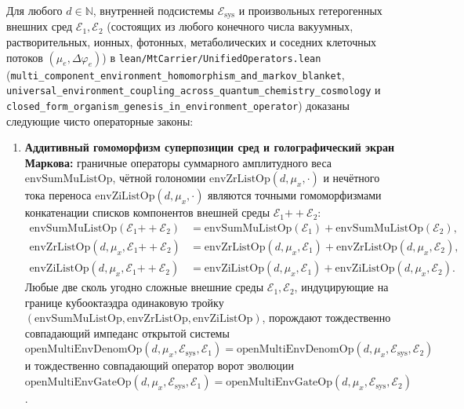 \begin{theorem}
\label{thm:bio-closed-form-genesis-in-environment}
Для любого $d\in\mathbb{N}$, внутренней подсистемы $\mathcal{E}_{\mathrm{sys}}$ и произвольных гетерогенных внешних сред $\mathcal{E}_1,\mathcal{E}_2$ (состоящих из любого конечного числа вакуумных, растворительных, ионных, фотонных, метаболических и соседних клеточных потоков $(\mu_e,\Delta\varphi_e)$) в \texttt{lean/MtCarrier/UnifiedOperators.lean} (\texttt{multi\_component\_environment\_homomorphism\_and\_markov\_blanket}, \texttt{universal\_environment\_coupling\_across\_quantum\_chemistry\_cosmology} и \texttt{closed\_form\_organism\_genesis\_in\_environment\_operator}) доказаны следующие чисто операторные законы:
\begin{enumerate}[label=\textbf{(\roman*)},leftmargin=*]
\item \textbf{Аддитивный гомоморфизм суперпозиции сред и голографический экран Маркова:}
  граничные операторы суммарного амплитудного веса $\mathrm{envSumMuListOp}$, чётной голономии $\mathrm{envZrListOp}(d,\mu_x,\cdot)$ и нечётного тока переноса $\mathrm{envZiListOp}(d,\mu_x,\cdot)$ являются точными гомоморфизмами конкатенации списков компонентов внешней среды $\mathcal{E}_1\mathbin{++}\mathcal{E}_2$:
  \begin{equation}
  \label{eq:env-list-homomorphism}
  \begin{aligned}
    \mathrm{envSumMuListOp}(\mathcal{E}_1\mathbin{++}\mathcal{E}_2) &= \mathrm{envSumMuListOp}(\mathcal{E}_1) + \mathrm{envSumMuListOp}(\mathcal{E}_2),\\
    \mathrm{envZrListOp}(d,\mu_x,\mathcal{E}_1\mathbin{++}\mathcal{E}_2) &= \mathrm{envZrListOp}(d,\mu_x,\mathcal{E}_1) + \mathrm{envZrListOp}(d,\mu_x,\mathcal{E}_2),\\
    \mathrm{envZiListOp}(d,\mu_x,\mathcal{E}_1\mathbin{++}\mathcal{E}_2) &= \mathrm{envZiListOp}(d,\mu_x,\mathcal{E}_1) + \mathrm{envZiListOp}(d,\mu_x,\mathcal{E}_2).
  \end{aligned}
  \end{equation}
  Любые две сколь угодно сложные внешние среды $\mathcal{E}_1,\mathcal{E}_2$, индуцирующие на границе кубооктаэдра одинаковую тройку $(\mathrm{envSumMuListOp},\mathrm{envZrListOp},\mathrm{envZiListOp})$, порождают тождественно совпадающий импеданс открытой системы $\mathrm{openMultiEnvDenomOp}(d,\mu_x,\mathcal{E}_{\mathrm{sys}},\mathcal{E}_1) = \mathrm{openMultiEnvDenomOp}(d,\mu_x,\mathcal{E}_{\mathrm{sys}},\mathcal{E}_2)$ и тождественно совпадающий оператор ворот эволюции $\mathrm{openMultiEnvGateOp}(d,\mu_x,\mathcal{E}_{\mathrm{sys}},\mathcal{E}_1) = \mathrm{openMultiEnvGateOp}(d,\mu_x,\mathcal{E}_{\mathrm{sys}},\mathcal{E}_2)$.

\end{enumerate}
\end{theorem}
